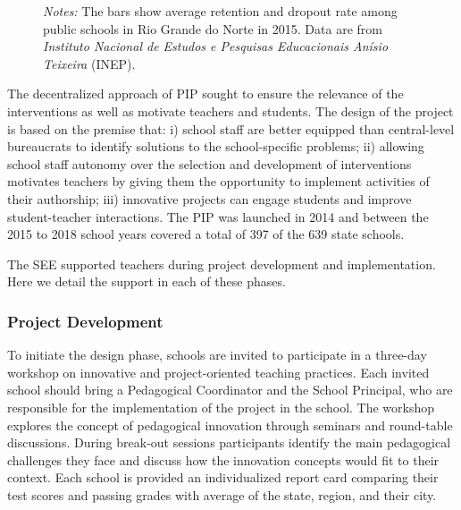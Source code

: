 \documentclass[11pt,a4paper]{article}
\begin{document}
\begin{figure}[htbp]
    \begin{minipage}{0.8\textwidth}
        \small{\textit{Notes:} The bars show average retention and dropout rate among public schools in Rio Grande do Norte in 2015. Data are from \textit{Instituto Nacional de Estudos e Pesquisas Educacionais Anísio Teixeira} (INEP).}
    \end{minipage}
\end{figure}
%

The decentralized approach of PIP sought to ensure the relevance of the interventions as well as motivate teachers and students. The design of the project is based on the premise that: i) school staff are better equipped than central-level bureaucrats to identify solutions to the school-specific problems; ii) allowing school staff autonomy over the selection and development of interventions motivates teachers by giving them the opportunity to implement activities of their authorship; iii) innovative projects can engage students and improve student-teacher interactions. The PIP was launched in 2014 and between the 2015 to 2018 school years covered a total of 397 of the 639 state schools.

The SEE supported teachers during project development and implementation. Here we detail the support in each of these phases.  

\subsubsection*{Project Development} \label{sec:project}

To initiate the design phase, schools are invited to participate in a three-day workshop on innovative and project-oriented teaching practices. Each invited school should bring a Pedagogical Coordinator and the School Principal, who are responsible for the implementation of the project in the school. The workshop explores the concept of pedagogical innovation through seminars and round-table discussions. During break-out sessions participants identify the main pedagogical challenges they face and discuss how the innovation concepts would fit to their context. Each school is provided an individualized report card comparing their test scores and passing grades with average of the state, region, and their city.
\end{document}
